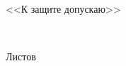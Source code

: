 \begin{ESKDtitlePage}
  \begin{center}
    \envDiplomMinistr

    \envDiplomEducation

    \envDiplomUniversity

    \envDiplomCathedra
  \end{center}
  
  \vfill

  \begin{flushright}
    \begin{minipage}[t]{.45\textwidth}
      <<К защите допускаю>>

      \envDiplomHeadDepartmentInfo

      \underline{\hspace{3cm}} \envDiplomHeadDepartmentInitials~\envDiplomHeadCathedraSurname

      \envDiplomDateInput
    \end{minipage}
  \end{flushright}
  
  \vfill

  \begin{center}
    \envDiplomTitle

    \envDiplomDocumentTitle
  \end{center}

  \vfill

  \begin{center}
    \envCode
    
    Листов \pageref{LastPage}
  \end{center}

  \vfill

  

  \vfill

  \begin{center}
    \ESKDtheYear
  \end{center}
\end{ESKDtitlePage}
  